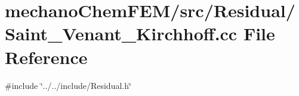 \section{mechano\+Chem\+F\+E\+M/src/\+Residual/\+Saint\+\_\+\+Venant\+\_\+\+Kirchhoff.cc File Reference}
\label{_saint___venant___kirchhoff_8cc}
{\ttfamily \#include \char`\"{}../../include/\+Residual.\+h\char`\"{}}\newline
